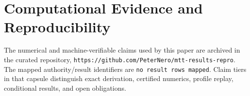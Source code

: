 \documentclass[11pt]{article}
\begin{document}



\section*{Computational Evidence and Reproducibility}
The numerical and machine-verifiable claims used by this paper are archived in the curated repository, \texttt{https://github.com/PeterNero/mtt-results-repro}. The mapped authority/result identifiers are \texttt{no result rows mapped}. Claim tiers in that capsule distinguish exact derivation, certified numerics, profile replay, conditional results, and open obligations.
\end{document}
